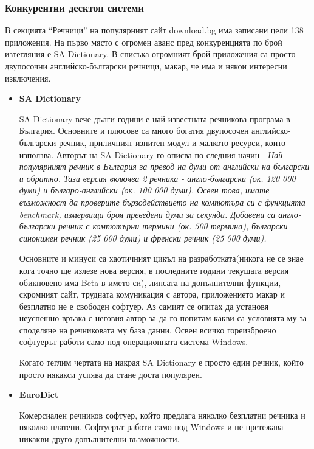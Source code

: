 \subsubsection{Конкурентни десктоп системи}
В секцията "`Речници"' на популярният сайт download.bg има записани
цели 138 приложения. На първо място с огромен аванс пред конкуренцията
по брой изтегляния е SA Dictionary. В списъка огромният брой
приложения са просто двупосочни английско-български речници, макар, че
има и някои интересни изключения.
\begin{itemize}
  \item \textbf{SA Dictionary}

    SA Dictionary вече дълги години е най-известната речникова
    програма в България. Основните и плюсове са много богатия
    двупосочен английско-български речник, приличният изпитен модул и
    малкото ресурси, които използва. Авторът на SA Dictionary го
    описва по следния начин - \emph{Най-популярният речник в България за
    превод на думи от английски на български и обратно. Тази версия
    включва 2 речника - англо-български (ок. 120 000 думи) и
    българо-английски (ок. 100 000 думи). Освен това, имате възможност
    да проверите бързодействието на компютъра си с функцията
    benchmark, измерваща броя преведени думи за секунда. Добавени са
    англо-български речник с компютърни термини (ок. 500 термина),
    български синонимен речник (25 000 думи) и френски речник (25 000
    думи).}

    Основните и минуси са хаотичният цикъл на разработката(никога не
    се знае кога точно ще излезе нова версия, в последните години
    текущата версия обикновено има Beta в името си), липсата на
    допълнителни функции, скромният сайт, трудната комуникация с
    автора, приложението макар и безплатно не е свободен софтуер. Аз
    самият се опитах да установя неуспешно връзка с неговия автор за
    да го попитам какви са условията му за споделяне на речниковата му
    база данни. Освен всичко гореизброено софтуерът работи само под
    операционната система Windows.

    Когато теглим чертата на накрая SA Dictionary е просто един
    речник, който просто някакси успява да стане доста популярен.

  \item \textbf{EuroDict}

    Комерсиален речников софтуер, който предлага няколко безплатни
    речника и няколко платени. Софтуерът работи само под Windows и не
    претежава никакви друго допълнителни възможности.
\end{itemize}
